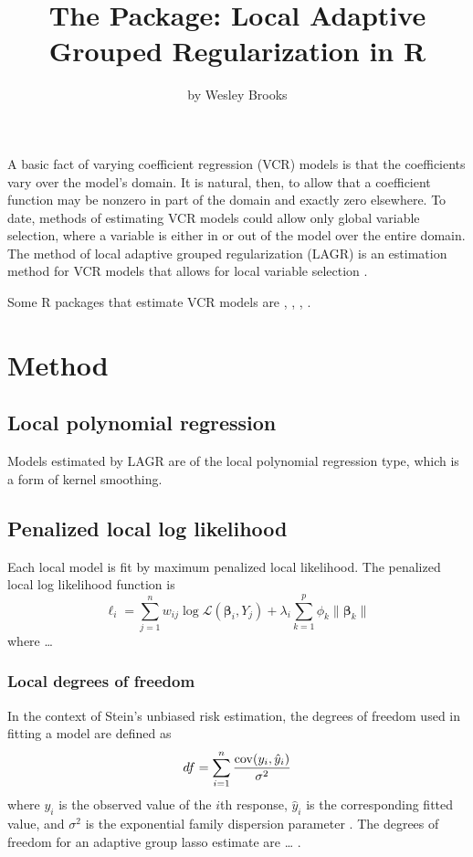 \title{The  Package: Local Adaptive Grouped Regularization in R}
\author{by Wesley Brooks}

\maketitle


A basic fact of varying coefficient regression (VCR) models is that the coefficients vary over the model’s domain. It is natural, then, to allow that a coefficient function may be nonzero in part of the domain and exactly zero elsewhere. To date, methods of estimating VCR models could allow only global variable selection, where a variable is either in or out of the model over the entire domain. The method of local adaptive grouped regularization (LAGR) is an estimation method for VCR models that allows for local variable selection \citep{Brooks-Zhu-Lu-2014}.

Some R packages that estimate VCR models are , , , . 
 
\section{Method}
\subsection{Local polynomial regression}
Models estimated by LAGR are of the local polynomial regression type, which is a form of kernel smoothing. 

\subsection{Penalized local log likelihood}
Each local model is fit by maximum penalized local likelihood. The penalized local log likelihood function is
\begin{equation}\label{eq:df}
\ell_i = \sum_{j=1}^n w_{ij} \log{\mathcal{L}(\bm{\beta}_i, Y_j)} + \lambda_i \sum_{k=1}^p \phi_k \|\bm{\beta}_k \|
\end{equation}
where …

\subsubsection{Local degrees of freedom}
In the context of Stein’s unbiased risk estimation, the degrees of freedom used in fitting a model are defined as 
\begin{equation}
df = \sum_{i=1}^n \frac{{\rm cov}(y_i, \hat{y}_i)}{\sigma^2}
\end{equation}
where $y_i$ is the observed value of the $i$th response, $\hat{y}_i$ is the corresponding fitted value, and $\sigma^2$ is the exponential family dispersion parameter \citep{Efron-1986}. The degrees of freedom for an adaptive group lasso estimate are … \citep{Vaiter-Deledalle-Peyre-Fadili-Dossal-2012}.

